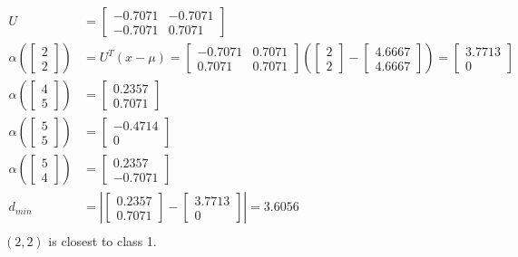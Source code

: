 \documentclass[fleqn]{article}
\begin{document}
\begin{description}
\begin{align*}
        U &= \begin{bmatrix} -0.7071 & -0.7071 \\ -0.7071 & 0.7071 \end{bmatrix} \\
        \alpha \left ( \begin{bmatrix}2 \\ 2\end{bmatrix} \right )
            &= U^T(x - \mu) = \begin{bmatrix} -0.7071 & 0.7071 \\ 0.7071 & 0.7071 \end{bmatrix}
            \left ( \begin{bmatrix}2 \\ 2\end{bmatrix} - \begin{bmatrix} 4.6667 \\ 4.6667 \end{bmatrix} \right )
            = \begin{bmatrix} 3.7713 \\ 0 \end{bmatrix} \\
        \alpha \left ( \begin{bmatrix}4 \\ 5\end{bmatrix} \right ) &= \begin{bmatrix}  0.2357 \\  0.7071 \end{bmatrix} \\
        \alpha \left ( \begin{bmatrix}5 \\ 5\end{bmatrix} \right ) &= \begin{bmatrix} -0.4714 \\  0      \end{bmatrix} \\
        \alpha \left ( \begin{bmatrix}5 \\ 4\end{bmatrix} \right ) &= \begin{bmatrix}  0.2357 \\ -0.7071 \end{bmatrix} \\
        d_{min} &= \left | \begin{bmatrix} 0.2357 \\ 0.7071 \end{bmatrix} - \begin{bmatrix} 3.7713 \\ 0 \end{bmatrix} \right | = 3.6056 \\
    \end{align*}
    \begin{math}(2,2)\end{math} is closest to class 1.

\end{description}
\end{document}
